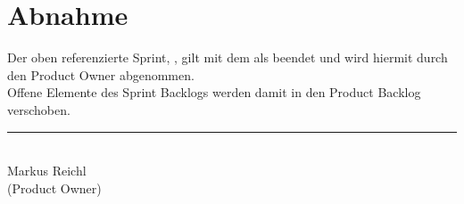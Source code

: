 \documentclass[alpha, signed]{tile-sprint} %
\begin{document}
\section{Abnahme}
Der oben referenzierte Sprint, {\makeatletter\@sprint\makeatother}, gilt mit dem {\makeatletter\@sprintend\makeatother} als beendet und wird hiermit durch den Product Owner abgenommen. \vspace{0.5em} \\
Offene Elemente des Sprint Backlogs werden damit in den Product Backlog verschoben.
\\ \vspace{0.5em}
\begin{center}
	\rule{0.25 \textwidth}{\headrulewidth} ~\\ \vspace{0.5em}
	Markus Reichl \\
	\footnotesize{(Product Owner)}
\end{center}
\end{document}
